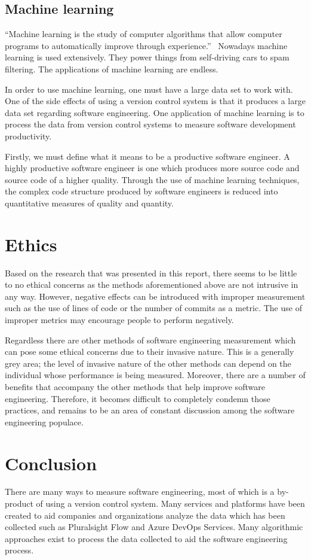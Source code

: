 \documentclass{article}
\begin{document}
\subsection{Machine learning}
``Machine learning is the study of computer algorithms that allow computer
programs to automatically improve through
experience.''~\cite{machine1997learning} Nowadays machine learning is used
extensively. They power things from self-driving cars to spam filtering. The
applications of machine learning are endless.

In order to use machine learning, one must have a large data set to work with.
One of the side effects of using a version control system is that it produces a
large data set regarding software engineering. One application of machine
learning is to process the data from version control systems to measure
software development productivity.

Firstly, we must define what it means to be a productive software engineer. A
highly productive software engineer is one which produces more source code and
source code of a higher quality. Through the use of machine learning
techniques, the complex code structure produced by software engineers is
reduced into quantitative measures of quality and
quantity.~\cite{helie2018measuring}

\section{Ethics}
Based on the research that was presented in this report, there seems to be
little to no ethical concerns as the methods aforementioned above are not
intrusive in any way. However, negative effects can be introduced with improper
measurement such as the use of lines of code or the number of commits as a
metric. The use of improper metrics may encourage people to perform negatively.

Regardless there are other methods of software engineering measurement which
can pose some ethical concerns due to their invasive nature. This is a
generally grey area; the level of invasive nature of the other methods can
depend on the individual whose performance is being measured. Moreover, there
are a number of benefits that accompany the other methods that help improve
software engineering. Therefore, it becomes difficult to completely condemn
those practices, and remains to be an area of constant discussion among the
software engineering populace.

\section{Conclusion}
There are many ways to measure software engineering, most of which is a
by-product of using a version control system. Many services and platforms have
been created to aid companies and organizations analyze the data which has been
collected such as Pluralsight Flow and Azure DevOps Services.  Many algorithmic
approaches exist to process the data collected to aid the software engineering
process.
\end{document}
